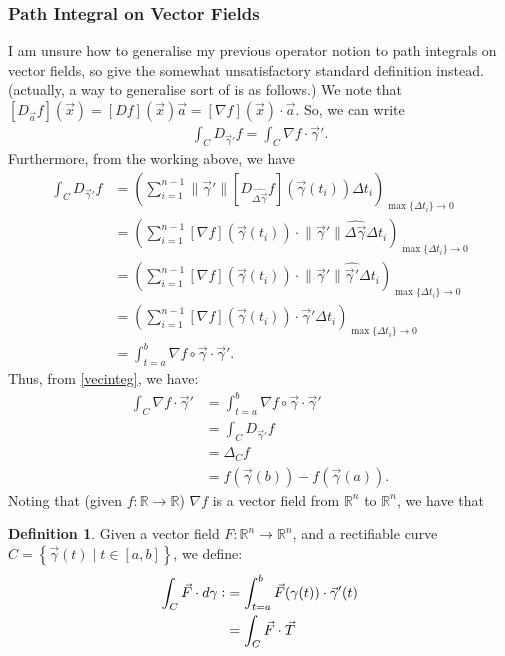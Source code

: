 \documentclass{article}
\newcommand{\vc}{\vcentcolon}
\theoremstyle{definition}
\newtheorem{defn}{Definition}[subsubsection]
\begin{document}
\subsubsection{Path Integral on Vector Fields}
I am unsure how to generalise my previous operator notion to path integrals on vector fields, so give the somewhat unsatisfactory standard definition instead.
(actually, a way to generalise sort of is as follows.)
We note that $[D_{\vec a}f](\vec x)=[Df](\vec x)\vec a=[\nabla f](\vec x)\cdot\vec a$. So, we can write
\begin{align}
	\int_CD_{\vec\gamma'}f=\int_C\nabla f\cdot\vec\gamma'.\label{vecinteg}
\end{align}
Furthermore, from the working above, we have
\begin{align*}
	\int_CD_{\vec\gamma'}f&=\left(\sum_{i=1}^{n-1}\lVert \vec\gamma'\rVert\left[D_{\hat{\Delta\vec\gamma}}f\right]\left(\vec\gamma (t_i)\right)\Delta t_i\right)_{\max\{\Delta t_i\}\rightarrow0}\\
	&=\left(\sum_{i=1}^{n-1}\left[\nabla f\right]\left(\vec\gamma (t_i)\right)\cdot\lVert \vec\gamma'\rVert\hat{\Delta\vec\gamma}\Delta t_i\right)_{\max\{\Delta t_i\}\rightarrow0}\\
	&=\left(\sum_{i=1}^{n-1}\left[\nabla f\right]\left(\vec\gamma (t_i)\right)\cdot\lVert \vec\gamma'\rVert\hat{\vec\gamma'}\Delta t_i\right)_{\max\{\Delta t_i\}\rightarrow0}\\
	&=\left(\sum_{i=1}^{n-1}\left[\nabla f\right]\left(\vec\gamma (t_i)\right)\cdot\vec\gamma'\Delta t_i\right)_{\max\{\Delta t_i\}\rightarrow0}\\
	&=\int_{t=a}^b\nabla f\circ\vec\gamma \cdot\vec\gamma'.
\end{align*}
Thus, from \eqref{vecinteg}, we have:
\begin{align*}
	\int_C\nabla f\cdot\vec\gamma'&=\int_{t=a}^b\nabla f\circ\vec\gamma \cdot\vec\gamma'\\
	&=\int_CD_{\vec\gamma'}f\\
	&=\Delta_Cf\\
	&=f(\vec\gamma(b))-f(\vec\gamma(a)).
\end{align*}
Noting that (given $f:\mathbb{R}\rightarrow \mathbb{R}$) $\nabla f$ is a vector field from $\mathbb{R}^n$ to $\mathbb{R}^n$, we have that 
\begin{defn}
	Given a vector field $F:\mathbb{R}^n\rightarrow \mathbb{R}^n$, and a rectifiable curve $C=\left\{\vec\gamma(t)\mid t\in[a,b]\right\}$, we define:
	\begin{align*}
		\int_C\vec F\cdot d\gamma\vc&=\int_{t=a}^b\vec F(\gamma(t))\cdot\vec \gamma'(t)\\
		&=\int_C\vec F\cdot\vec T
	\end{align*}
\end{defn}
\end{document}
